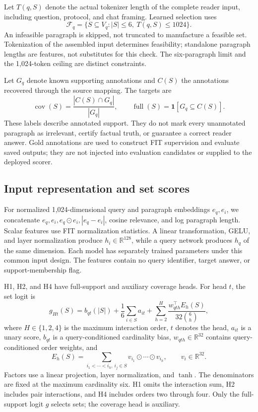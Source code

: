 \documentclass[preprint,12pt]{elsarticle}
\newcommand{\cov}{\operatorname{cov}}
\newcommand{\full}{\operatorname{full}}
\begin{document}
Let $T(q,S)$ denote the actual tokenizer length of the complete reader input, including question, protocol, and chat framing. Learned selection uses
\begin{equation}\label{eq:feas}
\mathcal F_q=\{S\subseteq V_q:|S|\leq6,\ T(q,S)\leq1024\}.
\end{equation}
An infeasible paragraph is skipped, not truncated to manufacture a feasible set. Tokenization of the assembled input determines feasibility; standalone paragraph lengths are features, not substitutes for this check. The six-paragraph limit and the 1,024-token ceiling are distinct constraints.

Let $G_q$ denote known supporting annotations and $C(S)$ the annotations recovered through the source mapping. The targets are
\begin{equation}\label{eq:targets}
\cov(S)=\frac{|C(S)\cap G_q|}{|G_q|},\qquad
\full(S)=\mathbf 1[G_q\subseteq C(S)].
\end{equation}
These labels describe annotated support. They do not mark every unannotated paragraph as irrelevant, certify factual truth, or guarantee a correct reader answer. Gold annotations are used to construct FIT supervision and evaluate saved outputs; they are not injected into evaluation candidates or supplied to the deployed scorer.

\subsection{Input representation and set scores}
For normalized 1,024-dimensional query and paragraph embeddings $e_q,e_i$, we concatenate $e_q,e_i,e_q\odot e_i,|e_q-e_i|$, cosine relevance, and log paragraph length. Scalar features use FIT normalization statistics. A linear transformation, GELU, and layer normalization produce $h_i\in\mathbb R^{128}$, while a query network produces $h_q$ of the same dimension. Each model has separately trained parameters under this common input design. The features contain no query identifier, target answer, or support-membership flag.

H1, H2, and H4 have full-support and auxiliary coverage heads. For head $t$, the set logit is
\begin{equation}\label{eq:score}
g_{Ht}(S)=b_{qt}(|S|)+\frac{1}{6}\sum_{i\in S}a_{it}
+\sum_{h=2}^{H}\frac{w_{qth}^{\top}E_h(S)}{32\binom{6}{h}},
\end{equation}
where $H\in\{1,2,4\}$ is the maximum interaction order, $t$ denotes the head, $a_{it}$ is a unary score, $b_{qt}$ is a query-conditioned cardinality bias, $w_{qth}\in\mathbb R^{32}$ contains query-conditioned order weights, and
\begin{equation}
E_h(S)=\sum_{i_1<\cdots<i_h,\ i_j\in S}
v_{i_1}\odot\cdots\odot v_{i_h},\qquad v_i\in\mathbb R^{32}.
\end{equation}
Factors use a linear projection, layer normalization, and $\tanh$. The denominators are fixed at the maximum cardinality six. H1 omits the interaction sum, H2 includes pair interactions, and H4 includes orders two through four. Only the full-support logit $g$ selects sets; the coverage head is auxiliary.
\end{document}
